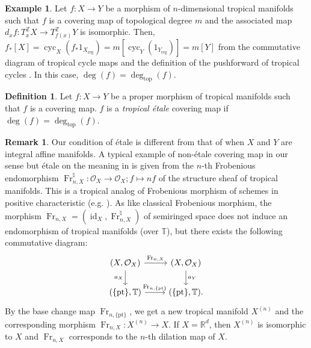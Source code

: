 \documentclass[a4paper,dvipdfmx,reqno,12pt]{amsart}
\theoremstyle{definition}
\newtheorem{definition}[theorem]{Definition}
\newtheorem{example}[theorem]{Example}
\newtheorem{remark}[theorem]{Remark}
\newcommand{\opn}[1]{\operatorname{#1}}
\numberwithin{equation}{section}
\begin{document}
\begin{example}
Let $f\colon X\to Y$ be a morphism of 
$n$-dimensional tropical manifolds such that $f$ is a 
covering map of topological degree $m$ and the associated map $d_xf\colon 
T_{x}^{\mathbb{Z}} X\to T_{f(x)}^{\mathbb{Z}}Y$ is 
isomorphic.
Then, $f_*[X]=\opn{cyc}_X(f_*1_{X_{\mathrm{reg}}})
=m[\opn{cyc}_Y(1_{Y_{\mathrm{reg}}})]=m
[Y]$ from the commutative diagram of
tropical cycle maps and the definition of the pushforward
of tropical cycles \cite[Definition 3.6]{gross2019sheaftheoretic}.
In this case, $\opn{deg}(f)=\opn{deg}_{\mathrm{top}}(f)$.
\end{example}

\begin{definition} \label{definition-etale-covering}
Let $f\colon X\to Y$ be a proper morphism 
of tropical manifolds such
that $f$ is a covering map.
$f$ is a \emph{tropical \'etale} covering map 
if $\opn{deg}(f)=\opn{deg}_{\mathrm{top}}(f)$.  
\end{definition}
\begin{remark}
Our condition of \'etale is different from that of 
\cite[Definition 1.1]{grossMirrorSymmetryLogarithmic2006a}
when $X$ and $Y$ are integral affine manifolds.
A typical example of non-\'etale covering map 
in our sense but \'etale on the meaning in 
\cite{grossMirrorSymmetryLogarithmic2006a} is given
from the $n$-th Frobenious endomorphism 
$\opn{Fr}_{n,X}^{\natural}\colon \mathcal{O}_X \to \mathcal{O}_X; f\mapsto nf$ of 
the structure sheaf of tropical manifolds. 
This is a tropical analog of Frobenious morphism of 
schemes in positive characteristic 
(e.g. \cite[IV. Remark 2.4.1]{hartshorneAlgebraicGeometry1977a}). As like classical Frobenious morphism, 
the morphism $\opn{Fr}_{n,X}=(\opn{id}_X,\opn{Fr}_{n,X}^{\natural})$ of semiringed space does 
not induce an endomorphism of tropical manifolds 
(over $\mathbb{T}$), but
there exists the following commutative diagram:
\begin{equation}
\begin{tikzcd}
 (X,\mathcal{O}_X) \arrow[r,"{\opn{Fr}_{n,X}}"] 
\arrow[d,"{a_X}"']
 &   (X,\mathcal{O}_X) \arrow[d,"{a_Y}"] \\
(\{\opn{pt}\},\mathbb{T})
\arrow[r,"{\opn{Fr}_{n,\{\opn{pt}\}}}"]
 & (\{\opn{pt}\},\mathbb{T}).
\end{tikzcd}
\end{equation}
By the base change map $\opn{Fr}_{n,\{\mathrm{pt}\}}$, we get 
a new tropical manifold $X^{(n)}$
and the corresponding morphism 
$\opn{Fr}_{n,X}\colon X^{(n)}\to X$. 
If $X=\mathbb{R}^{d}$, then $X^{(n)}$ is 
isomorphic to $X$ and 
$\opn{Fr}_{n,X}$ corresponds to 
the $n$-th dilation map of $X$.
\end{remark}
\end{document}
